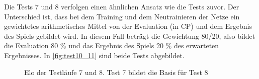 Die Tests 7 und 8 verfolgen einen ähnlichen Ansatz wie die Tests zuvor. Der Unterschied ist, dass bei dem Training und dem Neutrainieren der Netze ein gewichtetes arithmetisches Mittel von der Evaluation (in \ac{CP}) und dem Ergebnis des Spiels gebildet wird. In diesem Fall beträgt die Gewichtung 80/20, also bildet die Evaluation 80 \% und das Ergebnis des Spiels 20 \% des erwarteten Ergebnisses. In \autoref{fig:test10_11} sind beide Tests abgebildet.

\begin{figure}
  \centering
  \caption{Elo der Testläufe 7 und 8. Test 7 bildet die Basis für Test 8}
  \label{fig:test10_11}
\end{figure}



